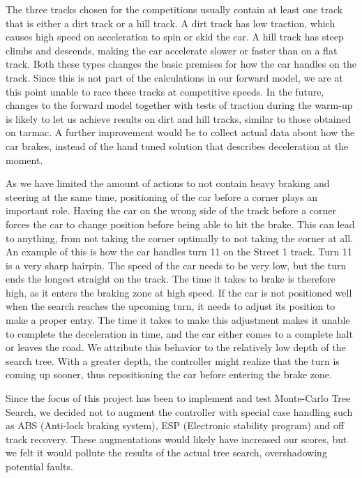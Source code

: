 \documentclass[conference]{IEEEtran}
\begin{document}
The three tracks chosen for the competitions usually contain at least one track that is either a dirt track or a hill track. A dirt track has low traction, which causes high speed on acceleration to spin or skid the car. A hill track has steep climbs and descends, making the car accelerate slower or faster than on a flat track. Both these types changes the basic premises for how the car handles on the track. Since this is not part of the calculations in our forward model, we are at this point unable to race these tracks at competitive speeds. In the future, changes to the forward model together with tests of traction during the warm-up is likely to let us achieve results on dirt and hill tracks, similar to those obtained on tarmac. A further improvement would be to collect actual data about how the car brakes, instead of the hand tuned solution that describes deceleration at the moment.

As we have limited the amount of actions to not contain heavy braking and steering at the same time, positioning of the car before a corner plays an important role. Having the car on the wrong side of the track before a corner forces the car to change position before being able to hit the brake. This can lead to anything, from not taking the corner optimally to not taking the corner at all. An example of this is how the car handles turn 11 on the Street 1 track. Turn 11 is a very sharp hairpin. The speed of the car needs to be very low, but the turn ends the longest straight on the track. The time it takes to brake is therefore high, as it enters the braking zone at high speed. If the car is not positioned well when the search reaches the upcoming turn, it needs to adjust its position to make a proper entry. The time it takes to make this adjustment makes it unable to complete the deceleration in time, and the car either comes to a complete halt or leaves the road. We attribute this behavior to the relatively low depth of the search tree. With a greater depth, the controller might realize that the turn is coming up sooner, thus repositioning the car before entering the brake zone.

Since the focus of this project has been to implement and test Monte-Carlo Tree Search, we decided not to augment the controller with special case handling such as ABS (Anti-lock braking system), ESP (Electronic stability program) and off track recovery. These augmentations would likely have increased our scores, but we felt it would pollute the results of the actual tree search, overshadowing potential faults.
\end{document}
